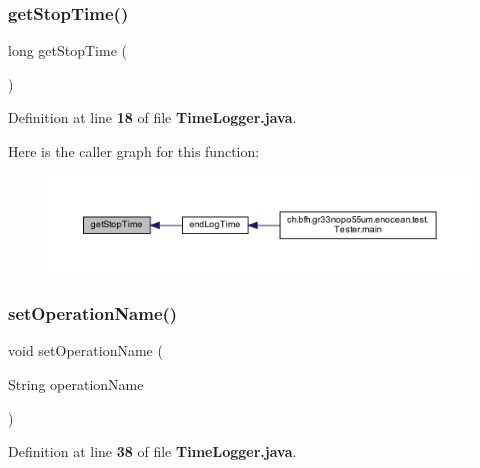 \subsubsection{get\+Stop\+Time()}
{\footnotesize\ttfamily long get\+Stop\+Time (\begin{DoxyParamCaption}{ }\end{DoxyParamCaption})\hspace{0.3cm}{\ttfamily [private]}}



Definition at line {\bf 18} of file {\bf Time\+Logger.\+java}.

Here is the caller graph for this function\+:\nopagebreak
\begin{figure}[H]
\begin{center}
\leavevmode
\includegraphics[width=350pt]{dc/d8d/classch_1_1bfh_1_1gr33nopo55um_1_1enocean_1_1helper_1_1TimeLogger_af812cd2642dad59eb9d33ca75d9b590f_icgraph}
\end{center}
\end{figure}
\label{classch_1_1bfh_1_1gr33nopo55um_1_1enocean_1_1helper_1_1TimeLogger_ae4be683ce27a9989cd63500d18db61a5} 
\subsubsection{set\+Operation\+Name()}
{\footnotesize\ttfamily void set\+Operation\+Name (\begin{DoxyParamCaption}\item[{String}]{operation\+Name }\end{DoxyParamCaption})}



Definition at line {\bf 38} of file {\bf Time\+Logger.\+java}.

